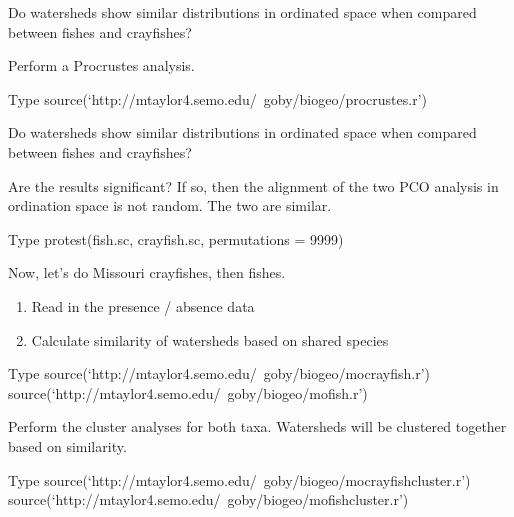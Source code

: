 \documentclass[xcolor=svgnames]{beamer}
\begin{document}
\begin{frame}[plain]{Do watersheds show similar distributions in ordinated space when compared between fishes and crayfishes?}

Perform a Procrustes analysis.

\begin{block}{Type}
	source(`http://mtaylor4.semo.edu/~goby/biogeo/procrustes.r')
\end{block}
\end{frame}


{
\begin{frame}[plain]
\end{frame}
}

\begin{frame}[plain]{Do watersheds show similar distributions in ordinated space when compared between fishes and crayfishes?}

Are the results significant?  If so, then the alignment of the two PCO analysis in ordination space is not random. The two are similar.

\begin{block}{Type}
	protest(fish.sc, crayfish.sc, permutations = 9999)
\end{block}
\end{frame}

\begin{frame}[plain]{Now, let's do Missouri crayfishes, then fishes.}
\begin{enumerate}
	\item Read in the presence / absence data
	\item Calculate similarity of watersheds based on shared species
\end{enumerate}
\pause

\begin{block}{Type}
	source(`http://mtaylor4.semo.edu/~goby/biogeo/mocrayfish.r') \pause
	source(`http://mtaylor4.semo.edu/~goby/biogeo/mofish.r')
\end{block}
\end{frame}

\begin{frame}[plain]{Perform the cluster analyses for both taxa.}
Watersheds will be clustered together based on similarity. 
\pause

\begin{block}{Type}
	source(`http://mtaylor4.semo.edu/~goby/biogeo/mocrayfishcluster.r')
	\pause
	source(`http://mtaylor4.semo.edu/~goby/biogeo/mofishcluster.r')
\end{block}
\end{frame}
\end{document}
